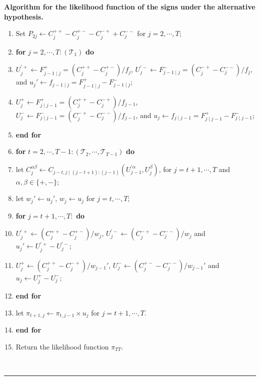 \documentclass[harvard,11pt]{article}
\newenvironment{proof}[1][Proof]{\textbf{#1.} }{\  \rule{0.5em}{0.5em}}
\begin{document}
\begin{proof}[Algorithm for the likelihood function of the signs under the alternative hypothesis]
\begin{enumerate}
\item  Set $P_{2j}\leftarrow C^{++}_j-C^{+-}_j-C^{-+}_j+C^{--}_j$ for $j=2,\cdots,T$;
\item \textbf{for} $j=2,\cdots,T:\left(\mathcal{T}_1\right)$ \textbf{do}
\item \hspace{10pt} \parbox[t]{\linegoal}{$U_j^{'+}\leftarrow F_{j-1\mid j}^{+}=\left(C^{++}_j-C^{+-}_j\right)/f_j$, $U_j^{'-}\leftarrow F_{j-1\mid j}^{-}=\left(C^{-+}_j-C^{--}_j\right)/f_j$, and $u_j'\leftarrow f_{j-1\mid j}=F_{j-1\mid j}^{+}-F_{j-1\mid j}^{-}$;}
\item \hspace{10pt} \parbox[t]{\linegoal}{$U_j^{+}\leftarrow F_{j\mid j-1}^{+}=\left(C^{++}_j-C^{-+}_j\right)/f_{j-1}$, $U_j^{-}\leftarrow F_{j\mid j-1}^{-}=\left(C^{-+}_j-C^{--}_j\right)/f_{j-1}$, and $u_j\leftarrow f_{j\mid j-1}=F_{j\mid j-1}^{+}-F_{j\mid j-1}^{-}$;}
\item \textbf{end for}
\item \textbf{for} $t=2,\cdots,T-1: \left(\mathcal{T}_2,\cdots,\mathcal{T}_{T-1}\right)$ \textbf{do}
\item\hspace{10pt} let $C^{\alpha\beta}_j\leftarrow C_{j-t,j\mid (j-t+1):(j-1)}\left(U^{'\alpha}_{j-1},U^{\beta}_j\right)$, for $j=t+1,\cdots,T$ and $\alpha,\beta\in\{+,-\}$; 
\item\hspace{10pt} let $w_{j}'\leftarrow u_{j}'$, $w_{j}\leftarrow u_{j}$ for $j=t,\cdots,T;$
\item\hspace{10pt} \textbf{for} $j=t+1,\cdots,T:$ \textbf{do}
\item\hspace{30pt} $U^{'+}_{j}\leftarrow \left(C^{++}_j-C^{+-}_j\right)/w_j$, $U^{'-}_{j}\leftarrow \left(C^{-+}_j-C^{--}_j\right)/w_j$ and $u_j'\leftarrow U^{'+}_{j}-U^{'-}_{j}$;
\item\hspace{30pt} $U^{+}_{j}\leftarrow \left(C^{++}_j-C^{-+}_j\right)/w_{j-1}'$, $U^{-}_{j}\leftarrow \left(C^{+-}_j-C^{--}_j\right)/w_{j-1}'$ and $u_j\leftarrow U^{+}_{j}-U^{-}_{j}$;
\item\hspace{10pt} \textbf{end for}
\item\hspace{10pt} let $\pi_{t+1,j}\leftarrow \pi_{t,j-1}\times u_j$ for $j=t+1,\cdots,T$.
\item\textbf{end for}
\item Return the likelihood function $\pi_{TT}$.
\end{enumerate}
\end{proof}
\end{document}
